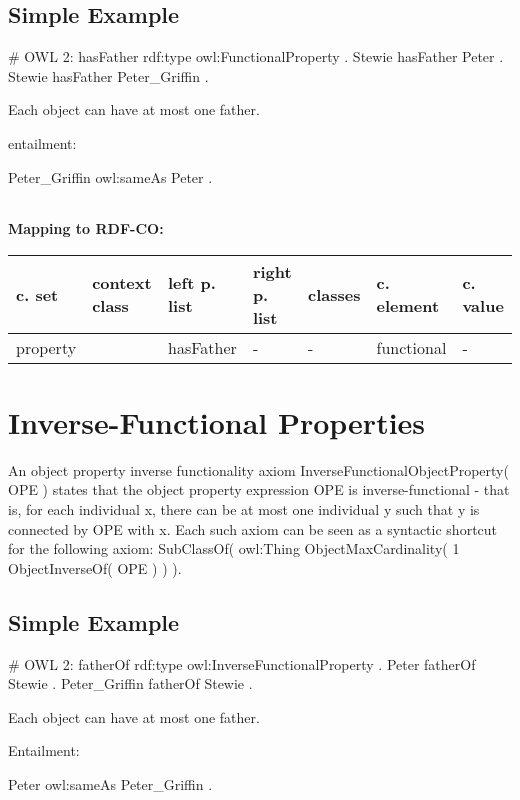 \documentclass{llncs}
\newenvironment{gcotable}{
  \scriptsize
  \sffamily
  \vspace{0cm}
	\begin{center}
	\textbf{\vspace{0.4cm}Mapping to RDF-CO:} \\
  \begin{tabular}{l|l|l|l|l|l|l}
	\hline
  \textbf{c. set} & \textbf{context class} & \textbf{left p. list} & \textbf{right p. list} & \textbf{classes} & \textbf{c. element} & \textbf{c. value} \\
  \hline

}{
  \hline
  \end{tabular}
	\end{center}
}
\newenvironment{DL}{
\vspace{0cm}
	\begin{center}
  \begin{tabular}{r l}

}{
  \end{tabular}
	\end{center}
}
\begin{document}
\subsection{Simple Example}

\begin{ex}
# OWL 2:
hasFather rdf:type owl:FunctionalProperty . 	
Stewie hasFather Peter . 	
Stewie hasFather Peter_Griffin . 
\end{ex}

Each object can have at most one father. 

entailment:

\begin{ex}
Peter_Griffin owl:sameAs Peter .  
\end{ex}

\begin{DL}

\end{DL}

\begin{gcotable}
property &  & hasFather & - & - & functional & - \\
\end{gcotable}

\section{Inverse-Functional Properties}

An object property inverse functionality axiom InverseFunctionalObjectProperty( OPE ) states that the object property expression OPE is inverse-functional - that is, for each individual x, there can be at most one individual y such that y is connected by OPE with x. Each such axiom can be seen as a syntactic shortcut for the following axiom: SubClassOf( owl:Thing ObjectMaxCardinality( 1 ObjectInverseOf( OPE ) ) ).

\subsection{Simple Example}

\begin{ex}
# OWL 2:
fatherOf rdf:type owl:InverseFunctionalProperty . 	
Peter fatherOf Stewie .
Peter_Griffin fatherOf Stewie .
\end{ex}

Each object can have at most one father. 

Entailment:

\begin{ex}
Peter owl:sameAs Peter_Griffin . 
\end{ex}
\end{document}
